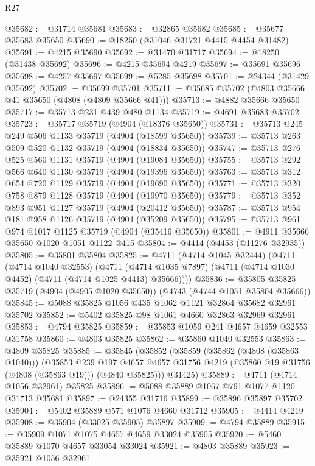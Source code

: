 \begin{lexlean}{R27}
\begin{coremodule}
@35682 := @31714 @35681
@35683 := @32865 @35682
@35685 := @35677 @35683 @35650
@35690 := @18250 (@31046 @31721 @4415 @4454 @31482)
@35691 := @4215 @35690
@35692 := @31470 @31717
@35694 := @18250 (@31438 @35692)
@35696 := @4215 @35694 @4219
@35697 := @35691 @35696
@35698 := @4257 @35697
@35699 := @5285 @35698
@35701 := @24344 (@31429 @35692)
@35702 := @35699 @35701
@35711 := @35685 @35702 (@4803 @35666 @41 @35650 (@4808 (@4809 @35666 @41)))
@35713 := @4882 @35666 @35650
@35717 := @35713 @231 @439 @480 @1134
@35719 := @4691 @35683 @35702
@35723 := @35717 @35719 (@4904 (@18376 @35650))
@35731 := @35713 @245 @249 @506 @1133 @35719 (@4904 (@18599 @35650))
@35739 := @35713 @263 @509 @520 @1132 @35719 (@4904 (@18834 @35650))
@35747 := @35713 @276 @525 @560 @1131 @35719 (@4904 (@19084 @35650))
@35755 := @35713 @292 @566 @640 @1130 @35719 (@4904 (@19396 @35650))
@35763 := @35713 @312 @654 @720 @1129 @35719 (@4904 (@19690 @35650))
@35771 := @35713 @320 @758 @879 @1128 @35719 (@4904 (@19970 @35650))
@35779 := @35713 @352 @893 @951 @1127 @35719 (@4904 (@20412 @35650))
@35787 := @35713 @954 @181 @958 @1126 @35719 (@4904 (@35209 @35650))
@35795 := @35713 @961 @974 @1017 @1125 @35719 (@4904 (@35416 @35650))
@35801 := @4911 @35666 @35650 @1020 @1051 @1122 @415
@35804 := @4414 (@4453 (@11276 @32935))
@35805 := @35801 @35804
@35825 := @4711
    (@4714 @1045 @32444)
    (@4711
      (@4714 @1040 @32553)
      (@4711 (@4714 @1035 @7897) (@4711 (@4714 @1030 @4452) (@4711 (@4714 @1025 @4413) @35666))))
@35836 := @35805 @35825 @35719 (@4904 (@4905 @1020 @35650)) (@4743 (@4744 @1051 @35804 @35666))
@35845 := @5088 @35825 @1056 @435 @1062 @1121 @32864 @35682 @32961 @35702
@35852 := @5402 @35825 @98 @1061 @4660 @32863 @32969 @32961
@35853 := @4794 @35825
@35859 := @35853 @1059 @241 @4657 @4659 @32553 @31758
@35860 := @4803 @35825
@35862 := @35860 @1040 @32553
@35863 := @4809 @35825
@35885 := @35845
    (@35852
      (@35859
        (@35862 (@4808 (@35863 @1040)))
        (@35853
          @239
          @197
          @4657
          @4657
          @31756
          @4219
          (@35860 @19 @31756 (@4808 (@35863 @19)))
          (@4840 @35825)))
      @31425)
@35889 := @4711 (@4714 @1056 @32961) @35825
@35896 := @5088 @35889 @1067 @791 @1077 @1120 @31713 @35681
@35897 := @24355 @31716
@35899 := @35896 @35897 @35702
@35904 := @5402 @35889 @571 @1076 @4660 @31712
@35905 := @4414 @4219
@35908 := @35904 (@33025 @35905) @35897
@35909 := @4794 @35889
@35915 := @35909 @1071 @1075 @4657 @4659 @33024 @35905
@35920 := @5460 @35889 @1070 @4657 @33054 @33024
@35921 := @4803 @35889
@35923 := @35921 @1056 @32961

\end{coremodule}
\end{lexlean}
